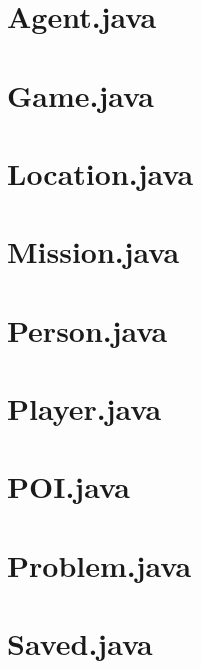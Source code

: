 \documentclass[letterpaper, 11pt]{report}
\begin{document}
\section{Agent.java}


\section{Game.java}


\section{Location.java}


\section{Mission.java}


\section{Person.java}


\section{Player.java}


\section{POI.java}


\section{Problem.java}


\section{Saved.java}

\end{document}
